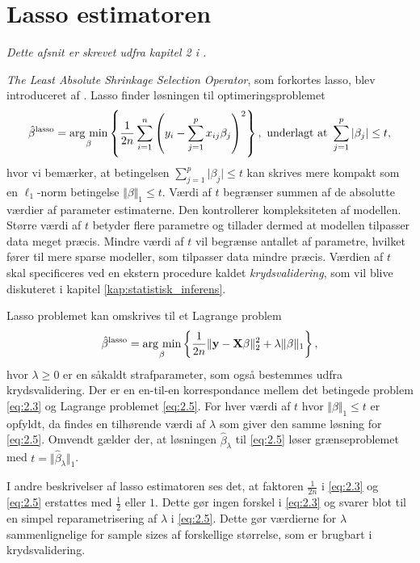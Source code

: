 \section{Lasso estimatoren} \label{sec:lasso_estimatoren}
\textit{Dette afsnit er skrevet udfra kapitel 2 i \citep{hastie}.}

\textit{The Least Absolute Shrinkage Selection Operator}, som forkortes lasso, blev introduceret af \citep{lasso}. 
Lasso finder løsningen til optimeringsproblemet
\begin{align}
\hat{\beta}^\text{lasso} = \argmin_{\beta} \cbr{\frac{1}{2n} \sum_{i=1}^n \del{y_i - \sum_{j=1}^p x_{ij} \beta_j}^2}, \ \text{underlagt at } \sum_{j=1}^p \vert \beta_j \vert \leq t, \label{eq:2.3}
\end{align} 
hvor vi bemærker, at betingelsen $\sum_{j=1}^p \vert \beta_j \vert \leq t$ kan skrives mere kompakt som en \(\ell_1\)-norm betingelse $\Vert \beta \Vert_1 \leq t$.
Værdi af \(t\) begrænser summen af de absolutte værdier af parameter estimaterne.
Den kontrollerer kompleksiteten af modellen. 
Større værdi af \(t\) betyder flere parametre og tillader dermed at modellen tilpasser data meget præcis.
Mindre værdi af \(t\) vil begrænse antallet af parametre, hvilket fører til mere sparse modeller, som tilpasser data mindre præcis.
Værdien af \(t\) skal specificeres ved en ekstern procedure kaldet \textit{krydsvalidering}, som vil blive diskuteret i kapitel \ref{kap:statistisk_inferens}.

Lasso problemet kan omskrives til et Lagrange problem
\begin{align}
\hat{\beta}^\text{lasso} = \argmin_{\beta} \cbr{\frac{1}{2n} \Vert \y - \X \beta \Vert_2^2 + \lambda \Vert \beta \Vert_1}, \label{eq:2.5}
\end{align}
hvor $\lambda \geq 0$ er en såkaldt strafparameter, som også bestemmes udfra krydsvalidering. 
Der er en en-til-en korrespondance mellem det betingede problem \eqref{eq:2.3} og Lagrange problemet \eqref{eq:2.5}. 
For hver værdi af \(t\) hvor \(\Vert \beta \Vert_1 \leq t\) er opfyldt, da findes en tilhørende værdi af $\lambda$ som giver den samme løsning for \eqref{eq:2.5}.
Omvendt gælder der, at løsningen $\hat{\beta}_\lambda$ til \eqref{eq:2.5} løser grænseproblemet med $t=\Vert \hat{\beta}_\lambda \Vert_1$.

I andre beskrivelser af lasso estimatoren ses det, at faktoren \(\frac{1}{2n}\) i \eqref{eq:2.3} og \eqref{eq:2.5} erstattes med \(\frac{1}{2}\) eller \(1\).
Dette gør ingen forskel i \eqref{eq:2.3} og svarer blot til en simpel reparametrisering af \(\lambda\) i \eqref{eq:2.5}.
Dette gør værdierne for \(\lambda\) sammenlignelige for sample sizes af forskellige størrelse, som er brugbart i krydsvalidering.


